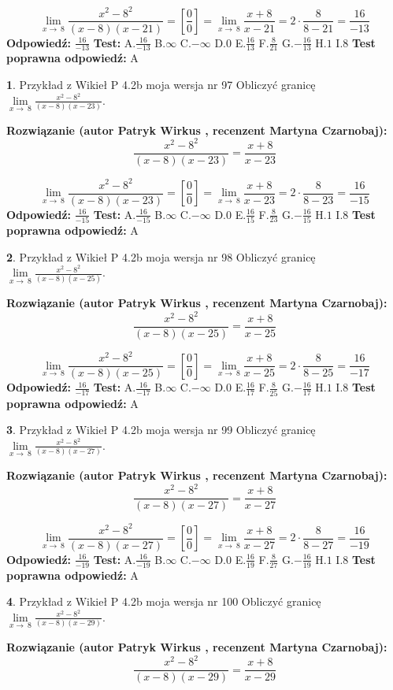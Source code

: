 \documentclass[12pt, a4paper]{article}
\theoremstyle{definition} %
\newtheorem{zad}{}
\newcommand{\zadStart}[1]{\begin{zad}#1\newline}
\newcommand{\zadStop}{\end{zad}}
\newcommand{\rozwStart}[2]{\noindent \textbf{Rozwiązanie (autor #1 , recenzent #2): }\newline}
\newcommand{\rozwStop}{\newline}
\newcommand{\odpStart}{\noindent \textbf{Odpowiedź:}\newline}
\newcommand{\odpStop}{\newline}
\newcommand{\testStart}{\noindent \textbf{Test:}\newline}
\newcommand{\testStop}{\newline}
\newcommand{\kluczStart}{\noindent \textbf{Test poprawna odpowiedź:}\newline}
\newcommand{\kluczStop}{\newline}
\begin{document}
$$\lim\limits_{x\to\ 8}\frac{x^{2}-8^{2}}{(x-8)(x-21)}=[\frac{0}{0}]=\lim\limits_{x\to\ 8}\frac{x+8}{x-21}=2 \cdot \frac{8}{8-21} = \frac{16}{-13}$$
\rozwStop
\odpStart
$\frac{16}{-13}$
\odpStop
\testStart
A.$\frac{16}{-13}$
B.$\infty$
C.$-\infty$
D.$0$
E.$\frac{16}{13}$
F.$\frac{8}{21}$
G.$-\frac{16}{13}$
H.$1$
I.$8$
\testStop
\kluczStart
A
\kluczStop



\zadStart{Przykład z Wikieł P 4.2b moja wersja nr 97}
Obliczyć granicę $\lim\limits_{x\to\ 8}\frac{x^{2}-8^{2}}{(x-8)(x-23)}$.
\zadStop
\rozwStart{Patryk Wirkus}{Martyna Czarnobaj}
$$\frac{x^{2}-8^{2}}{(x-8)(x-23)}=\frac{x+8}{x-23}$$

$$\lim\limits_{x\to\ 8}\frac{x^{2}-8^{2}}{(x-8)(x-23)}=[\frac{0}{0}]=\lim\limits_{x\to\ 8}\frac{x+8}{x-23}=2 \cdot \frac{8}{8-23} = \frac{16}{-15}$$
\rozwStop
\odpStart
$\frac{16}{-15}$
\odpStop
\testStart
A.$\frac{16}{-15}$
B.$\infty$
C.$-\infty$
D.$0$
E.$\frac{16}{15}$
F.$\frac{8}{23}$
G.$-\frac{16}{15}$
H.$1$
I.$8$
\testStop
\kluczStart
A
\kluczStop



\zadStart{Przykład z Wikieł P 4.2b moja wersja nr 98}
Obliczyć granicę $\lim\limits_{x\to\ 8}\frac{x^{2}-8^{2}}{(x-8)(x-25)}$.
\zadStop
\rozwStart{Patryk Wirkus}{Martyna Czarnobaj}
$$\frac{x^{2}-8^{2}}{(x-8)(x-25)}=\frac{x+8}{x-25}$$

$$\lim\limits_{x\to\ 8}\frac{x^{2}-8^{2}}{(x-8)(x-25)}=[\frac{0}{0}]=\lim\limits_{x\to\ 8}\frac{x+8}{x-25}=2 \cdot \frac{8}{8-25} = \frac{16}{-17}$$
\rozwStop
\odpStart
$\frac{16}{-17}$
\odpStop
\testStart
A.$\frac{16}{-17}$
B.$\infty$
C.$-\infty$
D.$0$
E.$\frac{16}{17}$
F.$\frac{8}{25}$
G.$-\frac{16}{17}$
H.$1$
I.$8$
\testStop
\kluczStart
A
\kluczStop



\zadStart{Przykład z Wikieł P 4.2b moja wersja nr 99}
Obliczyć granicę $\lim\limits_{x\to\ 8}\frac{x^{2}-8^{2}}{(x-8)(x-27)}$.
\zadStop
\rozwStart{Patryk Wirkus}{Martyna Czarnobaj}
$$\frac{x^{2}-8^{2}}{(x-8)(x-27)}=\frac{x+8}{x-27}$$

$$\lim\limits_{x\to\ 8}\frac{x^{2}-8^{2}}{(x-8)(x-27)}=[\frac{0}{0}]=\lim\limits_{x\to\ 8}\frac{x+8}{x-27}=2 \cdot \frac{8}{8-27} = \frac{16}{-19}$$
\rozwStop
\odpStart
$\frac{16}{-19}$
\odpStop
\testStart
A.$\frac{16}{-19}$
B.$\infty$
C.$-\infty$
D.$0$
E.$\frac{16}{19}$
F.$\frac{8}{27}$
G.$-\frac{16}{19}$
H.$1$
I.$8$
\testStop
\kluczStart
A
\kluczStop



\zadStart{Przykład z Wikieł P 4.2b moja wersja nr 100}
Obliczyć granicę $\lim\limits_{x\to\ 8}\frac{x^{2}-8^{2}}{(x-8)(x-29)}$.
\zadStop
\rozwStart{Patryk Wirkus}{Martyna Czarnobaj}
$$\frac{x^{2}-8^{2}}{(x-8)(x-29)}=\frac{x+8}{x-29}$$
\end{document}
